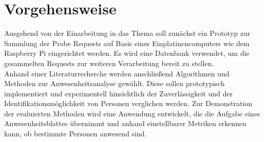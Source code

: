 \section{Vorgehensweise}

Ausgehend von der Einarbeitung in das Thema soll zunächst ein Prototyp zur Sammlung der Probe Requests auf Basis eines Einplatinencomputers wie dem Raspberry Pi eingerichtet werden.
Es wird eine Datenbank verwendet, um die gesammelten Requests zur weiteren Verarbeitung bereit zu stellen.
\\

Anhand einer Literaturrecherche werden anschließend Algorithmen und Methoden zur Anwesenheitsanalyse gewählt.
Diese sollen prototypisch implementiert und experimentell hinsichtlich der Zuverlässigkeit und der Identifikationsmöglichkeit von Personen verglichen werden.
Zur Demonstration der evaluierten Methoden wird eine Anwendung entwickelt, die die Aufgabe eines Anwesenheitsblattes übernimmt und anhand einstellbarer Metriken erkennen kann, ob bestimmte Personen anwesend sind.